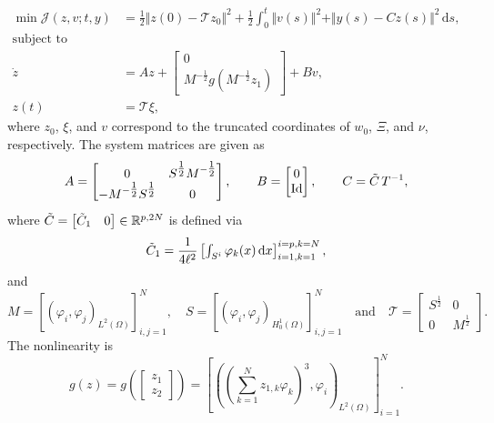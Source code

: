 \documentclass[11pt,reqno]{amsart}
\numberwithin{equation}{section}
\theoremstyle{plain}
\begin{document}
%
\begin{equation}\label{eq: SemiDOCPTraf}
	\begin{aligned}
		\min \mathcal{J}(z,v;t,y) 
		&= \frac{1}{2} \Vert z(0) - \mathcal{T} z_0 \Vert^2
		+ \frac{1}{2} \int_0^t \Vert v(s) \Vert^2 + \Vert y(s) - C z(s) \Vert^2 \, \mathrm{d}s,\\
		\text{subject to}~~~~~~~~~& \\
		\dot{z}
		&= A z
		+ \begin{bmatrix} 0 \\ M^{-\tfrac{1}{2}} g(M^{-\tfrac{1}{2}}z_1) \end{bmatrix}
		+ B v,\\
		z(t) &= \mathcal{T} \xi,
	\end{aligned}
\end{equation}
%
where $z_0$, $\xi$, and $v$ correspond to the truncated coordinates of $w_0$, $\Xi$, and $\nu$, respectively. The system matrices are given as
%
\begin{equation}\label{eq:sysMatWave}
	A = \begin{bmatrix} 0 & S^{\tfrac{1}{2}} M^{-\tfrac{1}{2}} 
		\\ - M^{-\tfrac{1}{2}} S^{\tfrac{1}{2}} & 0 \end{bmatrix},
	~~~~~~
	B = \begin{bmatrix} 0 \\ \mathrm{Id} \end{bmatrix},
	~~~~~~
	C = \Tilde{C} \, T^{-1},
\end{equation}
%
where $\Tilde{C}= \begin{bmatrix} \Tilde{C}_1 & 0 \end{bmatrix} \in \mathbb{R}^{p,2N}$ is defined via 
%
\begin{equation*}
	\Tilde{C}_1 =
	\frac{1}{4\ell^2}
	\begin{bmatrix} \int_{S^i} \varphi_k (x) \, \mathrm{d}x \end{bmatrix}_{i=1,k=1}^{i=p,k=N},
\end{equation*}
%
and
%
\begin{equation*}
	M = \left[ (\varphi_i,\varphi_j)_{L^2(\Omega)} \right]_{i,j=1}^N,
	\quad 
	S = \left[ (\varphi_i,\varphi_j)_{H^1_0(\Omega)} \right]_{i,j=1}^N
	\quad 
    \text{and}
    \quad 
	\mathcal{T} = \begin{bmatrix} S^{\tfrac{1}{2}} & 0 \\ 0 & M^{\tfrac{1}{2}} \end{bmatrix}.
\end{equation*}
%
The nonlinearity is
%
\begin{equation*}
	g(z) 
	= g\left(\begin{bmatrix} z_1 \\ z_2 \end{bmatrix} \right) 
	= \left[ \left( (\sum_{k=1}^N z_{1,k} \varphi_k )^3 , \varphi_i \right)_{L^2(\Omega)} \right]_{i=1}^N.
\end{equation*}
%
\end{document}

